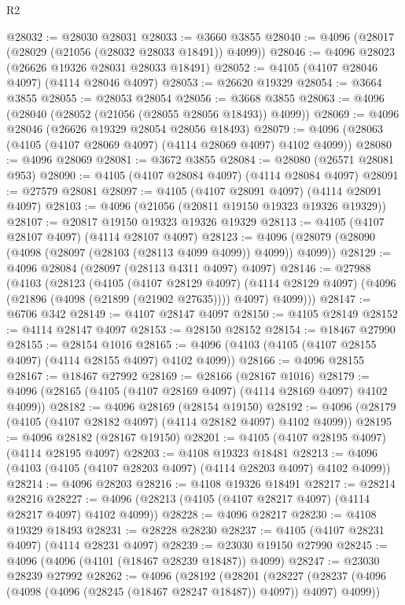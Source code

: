 \begin{lexlean}{R2}
\begin{coremodule}
@28032 := @28030 @28031
@28033 := @3660 @3855
@28040 := @4096 (@28017 (@28029 (@21056 (@28032 @28033 @18491)) @4099))
@28046 := @4096 @28023 (@26626 @19326 @28031 @28033 @18491)
@28052 := @4105 (@4107 @28046 @4097) (@4114 @28046 @4097)
@28053 := @26620 @19329
@28054 := @3664 @3855
@28055 := @28053 @28054
@28056 := @3668 @3855
@28063 := @4096 (@28040 (@28052 (@21056 (@28055 @28056 @18493)) @4099))
@28069 := @4096 @28046 (@26626 @19329 @28054 @28056 @18493)
@28079 := @4096 (@28063 (@4105 (@4107 @28069 @4097) (@4114 @28069 @4097) @4102 @4099))
@28080 := @4096 @28069
@28081 := @3672 @3855
@28084 := @28080 (@26571 @28081 @953)
@28090 := @4105 (@4107 @28084 @4097) (@4114 @28084 @4097)
@28091 := @27579 @28081
@28097 := @4105 (@4107 @28091 @4097) (@4114 @28091 @4097)
@28103 := @4096 (@21056 (@20811 @19150 @19323 @19326 @19329))
@28107 := @20817 @19150 @19323 @19326 @19329
@28113 := @4105 (@4107 @28107 @4097) (@4114 @28107 @4097)
@28123 := @4096 (@28079 (@28090 (@4098 (@28097 (@28103 (@28113 @4099 @4099)) @4099)) @4099))
@28129 := @4096 @28084 (@28097 (@28113 @4311 @4097) @4097)
@28146 := @27988
    (@4103
      (@28123
        (@4105
          (@4107 @28129 @4097)
          (@4114 @28129 @4097)
          (@4096 (@21896 (@4098 (@21899 (@21902 @27635)))) @4097)
          @4099)))
@28147 := @6706 @342
@28149 := @4107 @28147 @4097
@28150 := @4105 @28149
@28152 := @4114 @28147 @4097
@28153 := @28150 @28152
@28154 := @18467 @27990
@28155 := @28154 @1016
@28165 := @4096 (@4103 (@4105 (@4107 @28155 @4097) (@4114 @28155 @4097) @4102 @4099))
@28166 := @4096 @28155
@28167 := @18467 @27992
@28169 := @28166 (@28167 @1016)
@28179 := @4096 (@28165 (@4105 (@4107 @28169 @4097) (@4114 @28169 @4097) @4102 @4099))
@28182 := @4096 @28169 (@28154 @19150)
@28192 := @4096 (@28179 (@4105 (@4107 @28182 @4097) (@4114 @28182 @4097) @4102 @4099))
@28195 := @4096 @28182 (@28167 @19150)
@28201 := @4105 (@4107 @28195 @4097) (@4114 @28195 @4097)
@28203 := @4108 @19323 @18481
@28213 := @4096 (@4103 (@4105 (@4107 @28203 @4097) (@4114 @28203 @4097) @4102 @4099))
@28214 := @4096 @28203
@28216 := @4108 @19326 @18491
@28217 := @28214 @28216
@28227 := @4096 (@28213 (@4105 (@4107 @28217 @4097) (@4114 @28217 @4097) @4102 @4099))
@28228 := @4096 @28217
@28230 := @4108 @19329 @18493
@28231 := @28228 @28230
@28237 := @4105 (@4107 @28231 @4097) (@4114 @28231 @4097)
@28239 := @23030 @19150 @27990
@28245 := @4096 (@4096 (@4101 (@18467 @28239 @18487)) @4099)
@28247 := @23030 @28239 @27992
@28262 := @4096
    (@28192
      (@28201
        (@28227 (@28237 (@4096 (@4098 (@4096 (@28245 (@18467 @28247 @18487)) @4097)) @4097) @4099))

\end{coremodule}
\end{lexlean}
